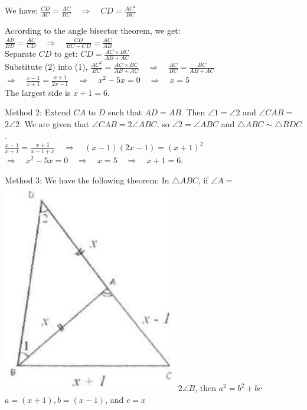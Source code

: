 \documentclass{article}
\begin{document}
We have: \(\frac{C D}{A C}=\frac{A C}{B C} \quad \Rightarrow \quad C D=\frac{A C^{2}}{B C}\)

According to the angle bisector theorem, we get:\\
\(\frac{A B}{B D}=\frac{A C}{C D} \quad \Rightarrow \quad \frac{C D}{B C-C D}=\frac{A C}{A B}\)\\
Separate \(C D\) to get: \(C D=\frac{A C \times B C}{A B+A C}\)\\
Substitute (2) into (1), \(\frac{A C^{2}}{B C}=\frac{A C \times B C}{A B+A C} \quad \Rightarrow \quad \frac{A C}{B C}=\frac{B C}{A B+A C}\)\\
\(\Rightarrow \quad \frac{x-1}{x+1}=\frac{x+1}{2 x-1} \quad \Rightarrow \quad x^{2}-5 x=0 \quad \Rightarrow \quad x=5\)\\
The largest side is \(x+1=6\).

Method 2: Extend \(C A\) to \(D\) such that \(A D=A B\). Then \(\angle 1=\angle 2\) and \(\angle C A B=\) \(2 \angle 2\). We are given that \(\angle C A B=2 \angle A B C\), so \(\angle 2=\angle A B C\) and \(\triangle A B C \sim \triangle B D C\).\\
\(\frac{x-1}{x+1}=\frac{x+1}{x-1+x} \quad \Rightarrow \quad(x-1)(2 x-1)=(x+1)^{2}\)\\
\(\Rightarrow \quad x^{2}-5 x=0 \quad \Rightarrow \quad x=5 \quad \Rightarrow \quad x+1=6\).

Method 3: We have the following theorem: In \(\triangle A B C\), if \(\angle A=\)\\
\includegraphics[width=\textwidth]{images/073.jpg} \(2 \angle B\), then \(a^{2}=b^{2}+b c\)\\
\(a=(x+1), b=(x-1)\), and \(c=x\)
\end{document}
